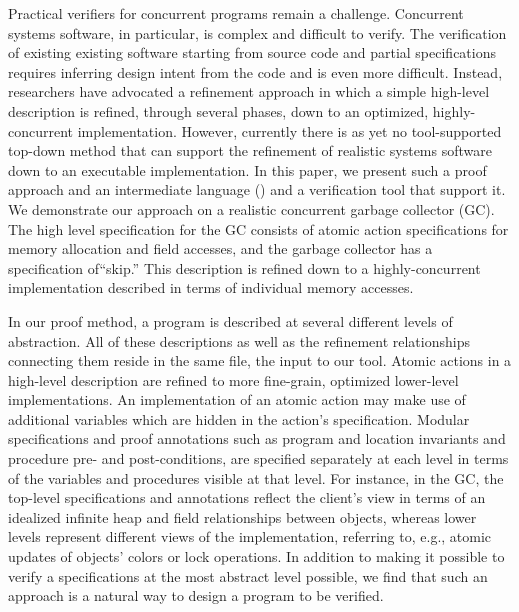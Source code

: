 Practical verifiers for concurrent programs remain a challenge.  
Concurrent systems software, in particular, is complex and difficult to verify. 
The verification of existing existing software starting from source code and partial specifications requires inferring design intent from the code and is even more difficult. 
Instead, researchers have advocated a refinement approach in which a simple high-level description is refined, through several phases, down to an optimized, highly-concurrent implementation.  However, currently there is as yet no tool-supported top-down method that can support the refinement of realistic systems software down to an executable implementation.  In this paper, we present such a proof approach and an intermediate language (\civl) and a verification tool that support it.  We demonstrate our approach on a realistic concurrent garbage collector (GC). The high level specification for the GC consists of atomic action specifications for memory allocation and field accesses, and the garbage collector has a specification of``skip.'' This description is refined down to a highly-concurrent implementation described in terms of individual memory accesses.

In our proof method, a program is described at several different levels of abstraction. 
All of these descriptions as well as the refinement relationships connecting them reside in the same \civl file, the input to our tool. 
Atomic actions in a high-level description are refined to more fine-grain, optimized lower-level implementations. An implementation of an atomic action may make use of additional variables which are hidden in the action's specification. 
Modular specifications and proof annotations such as program and location invariants and procedure pre- and post-conditions, are specified separately at each level in terms of the variables and procedures visible at that level. For instance, in the GC, the top-level specifications and annotations reflect the client's view in terms of an idealized infinite heap and field relationships between objects, 
 whereas lower levels represent different views of the implementation, referring to, e.g., atomic updates of objects' colors or lock operations.
In addition to making it possible to verify a specifications at the most abstract level possible, we find that such an approach is a natural way to design a program to be verified.  


